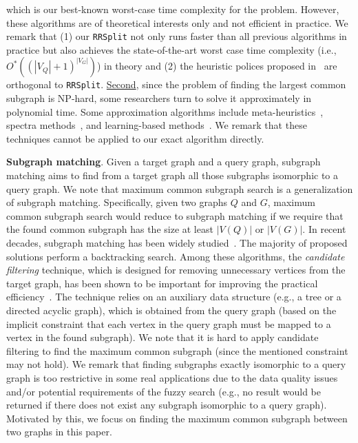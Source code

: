 {\chengB which is our best-known {\YuiR worst-case} time complexity for the problem.}
However, these algorithms are of theoretical interests only and not efficient in practice. We remark that (1) our \texttt{RRSplit} not only runs faster than all previous algorithms in practice but also achieves the state-of-the-art worst case time complexity (i.e., $O^*((|V_Q|+1)^{|V_G|})$) in theory and (2) the heuristic polices proposed in~\cite{zhoustrengthened,liu2020learning,liu2023hybrid} are orthogonal to \texttt{RRSplit}. \underline{Second}, since the problem of finding the largest common subgraph is NP-hard, some researchers turn to solve it approximately in polynomial time. Some approximation algorithms include meta-heuristics~\cite{choi2012efficient,rutgers2010approximate}, spectra methods~\cite{xiao2009generative}, and learning-based methods~\cite{zanfir2018deep,bai2021glsearch}. We remark that these techniques cannot be applied to our exact algorithm directly.

\smallskip
\noindent\textbf{Subgraph matching}. Given a target graph and a query graph, subgraph matching aims to find from a target graph all those subgraphs isomorphic to a query graph. We note that maximum common subgraph search is a generalization of subgraph matching. Specifically, given two graphs $Q$ and $G$, maximum common subgraph search {\chengC would} reduce to subgraph matching if 
{\chengB we require}
that the found common subgraph has the size at least $|V(Q)|$ or $|V(G)|$. In recent decades, subgraph matching has been widely studied~\cite{bhattarai2019ceci,ullmann1976algorithm,sun2020rapidmatch,sun2020subgraph,shang2008taming,kim2023fast,han2013turboiso,han2019efficient,cordella2004sub,bi2016efficient,arai2023gup,jin2023circinus,sun2023efficient}. The majority of proposed solutions perform a backtracking search. Among these algorithms, the \emph{candidate filtering} technique, which is designed for removing unnecessary vertices from the target graph, has been shown to be important for improving the practical efficiency~\cite{bhattarai2019ceci,bi2016efficient,han2019efficient,han2013turboiso,kim2023fast}. The technique relies on an auxiliary data structure (e.g., a tree or a directed acyclic graph), which is obtained from the query graph (based on the implicit constraint that each vertex in the query graph must be mapped to a vertex in the found subgraph). We note that it is hard to apply candidate filtering {\cheng to find} the maximum common subgraph (since the mentioned constraint may not hold).
%
We remark that finding subgraphs exactly isomorphic to a query graph is too restrictive in some real applications due to the data quality issues and/or potential requirements of the fuzzy search (e.g., no result {\chengC would} be returned if there does not exist any subgraph isomorphic to a query graph). Motivated by this, we focus on finding the maximum common subgraph between two graphs in this paper.